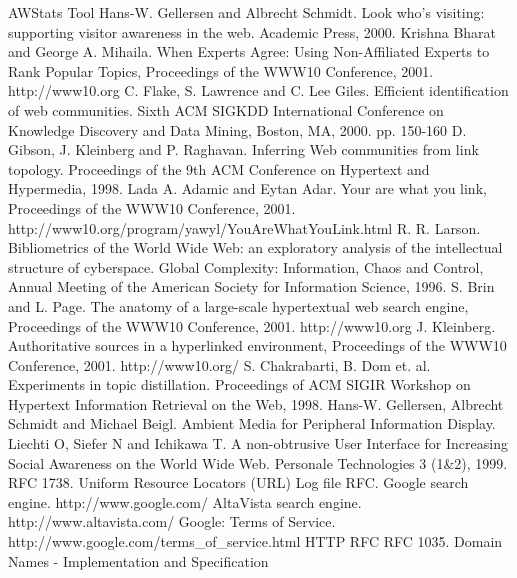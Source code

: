 \documentclass[a4paper]{danarticle}
\theoremstyle{remark}
\begin{document}
  \begin{thebibliography}{99}
     AWStats Tool
     Hans-W. Gellersen and Albrecht Schmidt.
    Look who's visiting: supporting visitor awareness in the web.
    Academic Press, 2000.
     Krishna Bharat and George A. Mihaila.
     When Experts Agree: Using Non-Affiliated Experts to Rank Popular Topics,
     Proceedings of the WWW10 Conference, 2001.
     http://www10.org
     C. Flake, S. Lawrence and C. Lee Giles.
    Efficient identification of web communities.
    Sixth ACM SIGKDD International Conference on Knowledge Discovery and Data 
    Mining, Boston, MA, 2000. 
    pp. 150-160
     D. Gibson, J. Kleinberg and P. Raghavan.
    Inferring Web communities from link topology.
    Proceedings of the 9th ACM Conference on Hypertext and Hypermedia, 1998.
     Lada A. Adamic and Eytan Adar.
    Your are what you link, Proceedings of the WWW10 Conference, 2001.
    http://www10.org/program/yawyl/YouAreWhatYouLink.html
     R. R. Larson.
    Bibliometrics of the World Wide Web: an exploratory analysis of the
    intellectual structure of cyberspace.
    Global Complexity: Information, Chaos and Control, Annual Meeting of the
    American Society for Information Science, 1996.
     S. Brin and L. Page.
    The anatomy of a large-scale hypertextual web search engine, 
    Proceedings of the WWW10 Conference, 2001.
    http://www10.org
     J. Kleinberg.
    Authoritative sources in a hyperlinked environment, Proceedings of the WWW10
    Conference, 2001.
    http://www10.org/
     S. Chakrabarti, B. Dom et. al.
    Experiments in topic distillation.
    Proceedings of ACM SIGIR Workshop on Hypertext Information Retrieval on
    the Web, 1998.
     Hans-W. Gellersen, Albrecht Schmidt and Michael Beigl.
    Ambient Media for Peripheral Information Display.
     Liechti O, Siefer N and Ichikawa T.
    A non-obtrusive User Interface for Increasing Social Awareness on the 
    World Wide Web. Personale Technologies 3 (1\&2), 1999.
     RFC 1738. Uniform Resource Locators (URL) 
     Log file RFC.
     Google search engine. http://www.google.com/
     AltaVista search engine. http://www.altavista.com/
     Google: Terms of Service.
    http://www.google.com/terms\_of\_service.html
     HTTP RFC
     RFC 1035. Domain Names - Implementation and Specification
  \end{thebibliography}
\end{document}

